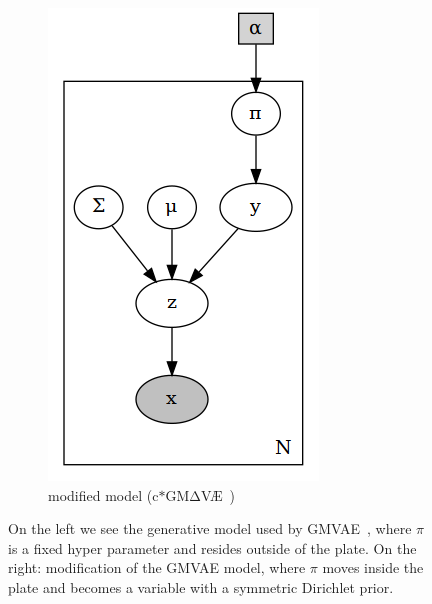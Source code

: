 \documentclass[11pt, a4paper]{report}
\theoremstyle{plain}
\theoremstyle{definition}
\theoremstyle{remark}
\newcommand{\gmvae}{c$\ast$GM$\mathrm{\Delta}$V\AE~}
\begin{document}
\begin{figure}[h]
\begin{subfigure}[b]{0.4\textwidth}
\includegraphics[width=\textwidth]{plots/mmpp.gv.png}
\caption{modified model (\gmvae)}
\label{fig:mymix}
\end{subfigure}
\caption{
On the left we see the generative model used by
GMVAE~\cite{dilokthanakul2016deep}, where $\pi$ is a fixed hyper parameter and resides
outside of the plate.
On the right: modification of the GMVAE model, where $\pi$ moves inside the plate
and becomes a variable with a symmetric Dirichlet prior.}
\label{fig:mixturemodels2}
\end{figure}
\end{document}
